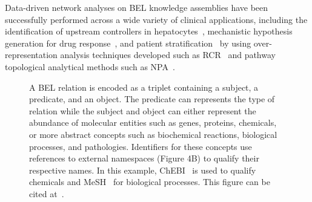Data-driven network analyses on \ac{BEL} knowledge assemblies have been successfully performed across a wide variety of clinical applications, including the identification of upstream controllers in hepatocytes~\cite{Deehan2012}, mechanistic hypothesis generation for drug response~\cite{Laifenfeld2014}, and patient stratification~\cite{Laifenfeld2012} by using over-representation analysis techniques developed such as \ac{RCR}~\cite{Catlett2013} and pathway topological analytical methods such as \ac{NPA}~\cite{Martin2014}.

\begin{figure}
    \captionsetup{format=plain}
    \caption[The Schema of a BEL Relation]{A BEL relation is encoded as a triplet containing a subject, a predicate, and an object. The predicate can represents the type of relation while the subject and object can either represent the abundance of molecular entities such as genes, proteins, chemicals, or more abstract concepts such as biochemical reactions, biological processes, and pathologies. Identifiers for these concepts use references to external namespaces (Figure 4B) to qualify their respective names. In this example, \ac{ChEBI}~\cite{Hastings2013} is used to qualify chemicals and \ac{MeSH}~\cite{ROGERS1963} for biological processes. This figure can be cited at~\cite{Hoyt2018BELSchema}.}
    \label{fig:bel_relation}
\end{figure}

